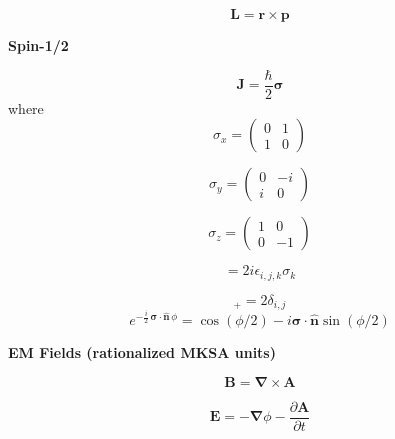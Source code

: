 \documentclass[11pt]{article}
\newcommand{\vect}[1]{\boldsymbol{\mathbf{#1}}}
\begin{document}
\begin{multicols}{2}
\begin{equation}
\vect{L} = \vect{r} \times \vect{p}
\end{equation}

{\bf Spin-1/2}

\begin{equation}
\vect{J} = \frac{\hbar}{2} \vect{\sigma}
\end{equation}
where
\begin{equation}
\sigma_x = \left(
           \begin{array}{cc}
              0 & 1 \\
              1 & 0
           \end{array}
           \right)
\end{equation}

\begin{equation}
\sigma_y = \left(
           \begin{array}{cc}
              0 & -i \\
              i & 0
           \end{array}
           \right)
\end{equation}

\begin{equation}
\sigma_z = \left(
           \begin{array}{cc}
              1 & 0 \\
              0 & -1
           \end{array}
           \right)
\end{equation}

\begin{equation}
[ \sigma_i, \sigma_j ] = 2i \epsilon_{i,j,k} \sigma_k
\end{equation}

\begin{equation}
[\,\sigma_i,\sigma_j\,]_+ = 2 \delta_{i,j}
\end{equation}
\begin{equation}
e^{- \frac{i}{2} \, \vect{\sigma} \cdot \vect{\hat{n}} \, \phi
     }
  = \cos(\phi /2) - i \vect{\sigma} \cdot \vect{\hat{n}} \sin(\phi /2)
\end{equation}

{\bf EM Fields (rationalized MKSA units)}

\begin{equation}
\vect{B} = \vect{\nabla} \times \vect{A}
\end{equation}

\begin{equation}
\vect{E} = -\vect{\nabla} \phi - \frac{\partial \vect{A}}{\partial t}
\end{equation}


\end{multicols}
\end{document}

